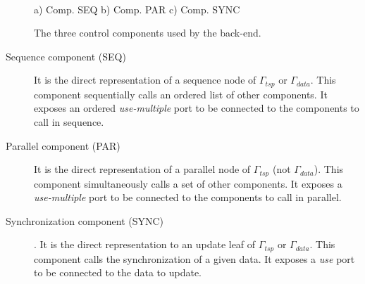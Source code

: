\begin{figure}[t]
\hspace{\fill}
\hspace{\fill}
\\
a) Comp. SEQ
\hspace{\fill}
b) Comp. PAR
\hspace{\fill}
c) Comp. SYNC
\\
\caption{The three control components used by the back-end.}
\label{fig:ctrlcomponents}
\end{figure}

\begin{description}
\item[Sequence component (SEQ)] It is the direct representation of a sequence node of $\Gamma_{tsp}$ or $\Gamma_{data}$. This component sequentially calls an ordered list of other components. It exposes an ordered \emph{use-multiple} port to be connected to the components to call in sequence.

\item[Parallel component (PAR)] It is the direct representation of a parallel node of $\Gamma_{tsp}$ (not $\Gamma_{data}$). This component simultaneously calls a set of other components. It exposes a \emph{use-multiple} port to be connected to the components to call in parallel.
  
\item[Synchronization component (SYNC)]. It is the direct representation to an update leaf of $\Gamma_{tsp}$ or $\Gamma_{data}$. This component calls the synchronization of a given data. It exposes a \emph{use} port to be connected to the data to update.
\end{description}

